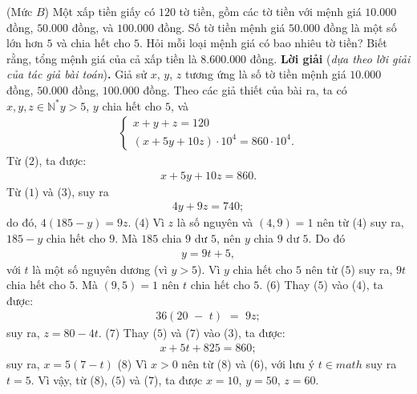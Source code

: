 \begin{multicols}{2}
	\setlength{\abovedisplayskip}{4pt}
	\setlength{\belowdisplayskip}{4pt}
	{}
	(Mức $B$) Một xấp tiền giấy có $120$ tờ tiền, gồm các tờ tiền với mệnh giá $10{.}000$ đồng, $50{.}000$ đồng, và $100{.}000$ đồng. Số tờ tiền mệnh giá $50{.}000$ đồng là một số lớn hơn $5$ và chia hết cho $5$. Hỏi mỗi loại mệnh giá có bao nhiêu tờ tiền? Biết rằng, tổng mệnh giá của cả xấp tiền là $8{.}600{.}000$ đồng.
	\vskip 0.05cm
	\textbf{Lời giải} (\textit{dựa theo lời giải của tác giả bài toán})\textbf{.}
	\vskip 0.05cm
	Giả sử $x$, $y$, $z$ tương ứng là số tờ tiền mệnh giá $10{.}000$ đồng, $50{.}000$ đồng, $100{.}000$ đồng.
	\vskip 0.05cm
	Theo các giả thiết của bài ra, ta có  $x,y,z \in \mathbb{N^*} y > 5$, $y$ chia hết cho $5$, và
	\begin{align*}
		\begin{cases}
			x + y + z = 120 \\
			(x + 5y + 10z) \cdot 10^4 = 860 \cdot 10^4. 
		\end{cases}
	\end{align*}
	Từ ($2$), ta được:
	\begin{align*}
		x + 5y + 10z = 860. \tag{$3$}
	\end{align*}
	Từ ($1$) và ($3$), suy ra
	\begin{align*}
		4y + 9z = 740;
	\end{align*}
	do đó, $4(185-y)= 9z$. \hfill ($4$)
	\vskip 0.05cm
	Vì $z$ là số nguyên và $(4, 9) = 1$ nên từ ($4$) suy ra, $185 - y$ chia hết cho $9$. Mà $185$ chia $9$ dư $5$, nên $y$ chia $9$ dư $5$. Do đó
	\begin{align*}
		y = 9t + 5,  \tag{$5$}
	\end{align*}
	với $t$ là một số nguyên dương (vì $y > 5$).
	\vskip 0.05cm
	Vì $y$ chia hết cho $5$ nên từ ($5$) suy ra, $9t$ chia hết cho $5$. Mà $(9, 5) = 1$ nên $t$ chia hết cho $5$.       \hfill           ($6$)
	\vskip 0.05cm
	Thay ($5$) vào ($4$), ta được:
	\begin{align*}
		36\left( {20\,\, - \,\,t} \right)\,\, = \,\,9z;
	\end{align*}
	suy ra, $z = 80 - 4t$. \hfill ($7$)
	\vskip 0.05cm
	Thay ($5$) và ($7$) vào ($3$), ta được:
	\begin{align*}
		x + 5t + 825 = 860;
	\end{align*}
	suy ra,  $x = 5 (7-t)$ \hfill ($8$)
	\vskip 0.05cm
	Vì $x > 0$ nên từ ($8$) và ($6$), với lưu ý $t \in math$  suy ra $t = 5$. Vì vậy, từ ($8$), ($5$) và ($7$), ta được $x = 10$, $y = 50$, $z = 60$.

\end{multicols}
